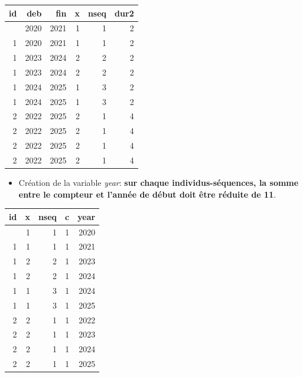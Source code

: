 \documentclass[
  12pt,
  letterpaper,
  DIV=11,
  numbers=noendperiod,
  onepage,
  openany]{scrreprt}
\newenvironment{Shaded}{\begin{snugshade}}{\end{snugshade}}
\newcommand{\AttributeTok}[1]{\textcolor[rgb]{0.80,0.80,0.80}{#1}}
\newcommand{\DecValTok}[1]{\textcolor[rgb]{0.86,0.86,0.80}{#1}}
\newcommand{\FunctionTok}[1]{\textcolor[rgb]{0.94,0.94,0.56}{#1}}
\newcommand{\NormalTok}[1]{\textcolor[rgb]{0.80,0.80,0.80}{#1}}
\newcommand{\OtherTok}[1]{\textcolor[rgb]{0.94,0.94,0.56}{#1}}
\newcommand{\SpecialCharTok}[1]{\textcolor[rgb]{0.86,0.64,0.64}{#1}}
\providecommand{\tightlist}{%
  \setlength{\itemsep}{0pt}\setlength{\parskip}{0pt}}\usepackage{longtable,booktabs,array}
\begin{document}
\begin{longtable}[]{@{}rrrrrr@{}}
\toprule\noalign{}
id & deb & fin & x & nseq & dur2 \\
\midrule\noalign{}
\endhead
\bottomrule\noalign{}
\endlastfoot
1 & 2020 & 2021 & 1 & 1 & 2 \\
1 & 2020 & 2021 & 1 & 1 & 2 \\
1 & 2023 & 2024 & 2 & 2 & 2 \\
1 & 2023 & 2024 & 2 & 2 & 2 \\
1 & 2024 & 2025 & 1 & 3 & 2 \\
1 & 2024 & 2025 & 1 & 3 & 2 \\
2 & 2022 & 2025 & 2 & 1 & 4 \\
2 & 2022 & 2025 & 2 & 1 & 4 \\
2 & 2022 & 2025 & 2 & 1 & 4 \\
2 & 2022 & 2025 & 2 & 1 & 4 \\
\end{longtable}

\begin{itemize}
\tightlist
\item
  Création de la variable \emph{year}: \textbf{sur chaque
  individus-séquences, la somme entre le compteur et l'année de début
  doit être réduite de 11}.
\end{itemize}

\begin{Shaded}
\end{Shaded}

\begin{longtable}[]{@{}rrrrr@{}}
\toprule\noalign{}
id & x & nseq & c & year \\
\midrule\noalign{}
\endhead
\bottomrule\noalign{}
\endlastfoot
1 & 1 & 1 & 1 & 2020 \\
1 & 1 & 1 & 1 & 2021 \\
1 & 2 & 2 & 1 & 2023 \\
1 & 2 & 2 & 1 & 2024 \\
1 & 1 & 3 & 1 & 2024 \\
1 & 1 & 3 & 1 & 2025 \\
2 & 2 & 1 & 1 & 2022 \\
2 & 2 & 1 & 1 & 2023 \\
2 & 2 & 1 & 1 & 2024 \\
2 & 2 & 1 & 1 & 2025 \\
\end{longtable}
\end{document}

